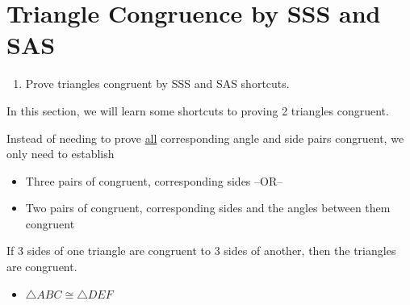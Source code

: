\documentclass{article}
\begin{document}
\section*{Triangle Congruence by SSS and SAS}

\begin{tcolorbox}[colframe=orange!70!white, coltitle=black, title=\textbf{Today I Can}]
\begin{enumerate}
    \item Prove triangles congruent by SSS and SAS shortcuts.
\end{enumerate}
\end{tcolorbox}

In this section, we will learn some shortcuts to proving 2 triangles congruent. \newline

Instead of needing to prove \underline{all} corresponding angle and side pairs congruent, we only need to establish
\begin{itemize}
    \item Three pairs of congruent, corresponding sides --OR--
    \item Two pairs of congruent, corresponding sides and the angles between them congruent
\end{itemize}

\bigskip 

\begin{tcolorbox}[colframe=black!20!white, opacitybacktitle=0.1, coltitle=black, title=\textbf{Side-Side-Side (SSS) Shortcut}]
If 3 sides of one triangle are congruent to 3 sides of another, then the triangles are congruent.
\newline

\begin{minipage}{0.3\textwidth}
\begin{itemize}
    \item $\triangle ABC \cong \triangle DEF$
\end{itemize}
\end{minipage}
\begin{minipage}{0.6\textwidth}
\hspace{0.25in}
\end{minipage}
\end{tcolorbox}
\end{document}
